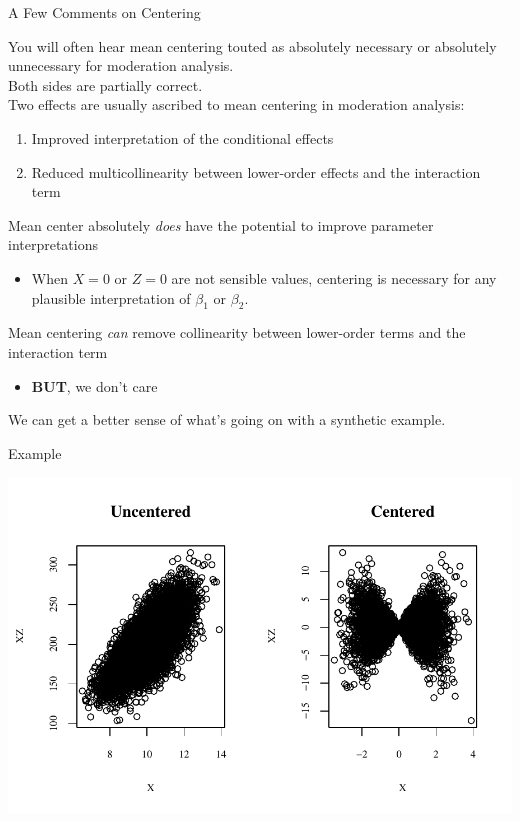 \documentclass{beamer}
\newcommand{\va}[0]{\vspace{12pt}}
\newcommand{\vb}[0]{\vspace{6pt}}
\begin{document}
\begin{frame}[allowframebreaks]{A Few Comments on Centering}
  
  You will often hear mean centering touted as absolutely necessary or
  absolutely unnecessary for moderation analysis.\\ 
  \va 
  Both sides are partially correct.\\ 
  \va 
  Two effects are usually ascribed to mean
  centering in moderation analysis: 
  \vb
  \begin{enumerate}
    \item Improved interpretation of the conditional effects 
      \vb
    \item Reduced multicollinearity between lower-order effects and
      the interaction term
  \end{enumerate}
  
  \pagebreak
  
  Mean center absolutely \emph{does} have the potential to improve
  parameter interpretations
  \vb
  \begin{itemize}
  \item When $X = 0$ or $Z = 0$ are not sensible values, centering is
    necessary for any plausible interpretation of $\beta_1$ or
    $\beta_2$.
  \end{itemize}
  \va 
  Mean centering \emph{can} remove collinearity between lower-order
  terms and the interaction term
  \vb
  \begin{itemize}
    \item \textbf{BUT}, we don't care
  \end{itemize}
  \va 
  We can get a better sense of what's going on with a synthetic
  example.
\end{frame}


\begin{frame}[allowframebreaks]{Example}
    


\pagebreak


\includegraphics{sweaveFiles/-005}

\end{frame}
\end{document}
